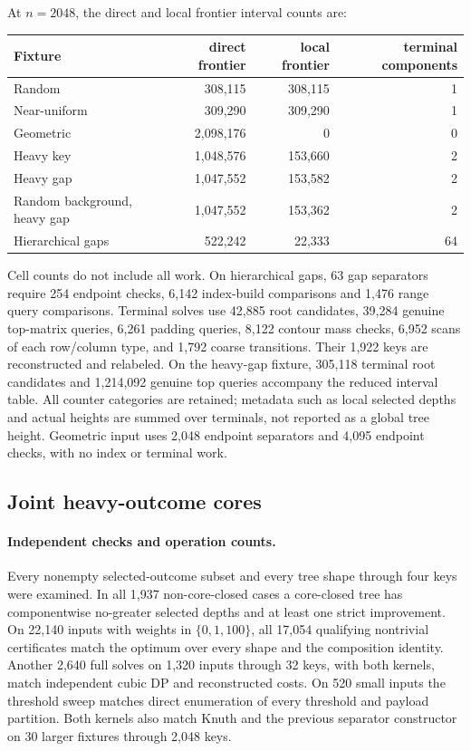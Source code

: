 \documentclass[11pt]{article}
\begin{document}
At $n=2048$, the direct and local frontier interval counts are:
\begin{center}\small
\begin{tabular}{lrrr}
\toprule
Fixture & direct frontier & local frontier & terminal components\\
\midrule
Random & 308,115 & 308,115 & 1\\
Near-uniform & 309,290 & 309,290 & 1\\
Geometric & 2,098,176 & 0 & 0\\
Heavy key & 1,048,576 & 153,660 & 2\\
Heavy gap & 1,047,552 & 153,582 & 2\\
Random background, heavy gap & 1,047,552 & 153,362 & 2\\
Hierarchical gaps & 522,242 & 22,333 & 64\\
\bottomrule
\end{tabular}
\end{center}
Cell counts do not include all work. On hierarchical gaps, 63 gap separators
require 254 endpoint checks, 6,142 index-build comparisons and 1,476 range
query comparisons. Terminal solves use 42,885 root candidates, 39,284 genuine
top-matrix queries, 6,261 padding queries, 8,122 contour mass checks, 6,952
scans of each row/column type, and 1,792 coarse transitions. Their 1,922 keys
are reconstructed and relabeled. On the heavy-gap fixture, 305,118 terminal
root candidates and 1,214,092 genuine top queries accompany the reduced
interval table. All counter categories are retained; metadata such as local
selected depths and actual heights are summed over terminals, not reported
as a global tree height. Geometric input uses 2,048 endpoint separators and
4,095 endpoint checks, with no index or terminal work.


\subsection{Joint heavy-outcome cores}
\paragraph{Independent checks and operation counts.}
Every nonempty selected-outcome subset and every tree shape through four keys
were examined. In all 1,937 non-core-closed cases a core-closed tree has
componentwise no-greater selected depths and at least one strict improvement.
On 22,140 inputs with weights in $\{0,1,100\}$, all 17,054 qualifying
nontrivial certificates match the optimum over every shape and the composition
identity. Another 2,640 full solves on 1,320 inputs through 32 keys, with both
kernels, match independent cubic DP and reconstructed costs. On 520 small
inputs the threshold sweep matches direct enumeration of every threshold and
payload partition. Both kernels also match Knuth and the previous separator
constructor on 30 larger fixtures through 2,048 keys.
\end{document}
